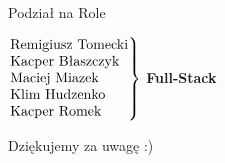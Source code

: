 \documentclass{beamer}
\begin{document}
\begin{frame}{Podział na Role}
    \begin{center}
        \Large
        $\left.
        \begin{tabular}{@{}l@{}}
             Remigiusz Tomecki \\
             Kacper Błaszczyk \\
             Maciej Miazek \\
             Klim Hudzenko \\
             Kacper Romek
        \end{tabular}
        \right\}$ \textbf{Full-Stack}
    \end{center}
\end{frame}

\begin{frame}
    \begin{center}
        \Huge Dziękujemy za uwagę :)
    \end{center}
\end{frame}
\end{document}
